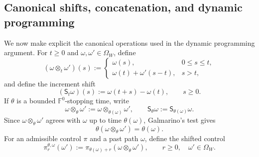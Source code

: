 \documentclass[11pt]{article}
\theoremstyle{definition}
\theoremstyle{remark}
\numberwithin{equation}{section}
\begin{document}
\subsection{Canonical shifts, concatenation, and dynamic programming}\label{subsec:DPP}
We now make explicit the canonical operations used in the dynamic programming argument.  For
$t\ge0$ and $\omega,\omega'\in\Omega_W$, define
\begin{equation}\label{eq:path-concatenation-control}
 (\omega\otimes_t\omega')(s)
 :=
 \begin{cases}
  \omega(s),&0\le s\le t,\\
  \omega(t)+\omega'(s-t),&s>t,
 \end{cases}
\end{equation}
and define the increment shift
\begin{equation}\label{eq:Wiener-shift-control}
 (\mathsf S_t\omega)(s):=\omega(t+s)-\omega(t),
 \qquad s\ge0.
\end{equation}
If $\theta$ is a bounded $\mathbb F^0$-stopping time, write
\[
 \omega\otimes_\theta\omega'
 :=\omega\otimes_{\theta(\omega)}\omega',
 \qquad
 \mathsf S_\theta\omega:=\mathsf S_{\theta(\omega)}\omega.
\]
Since $\omega\otimes_\theta\omega'$ agrees with $\omega$ up to time $\theta(\omega)$,
Galmarino's test gives
\begin{equation}\label{eq:stopping-time-stable-concatenation}
 \theta(\omega\otimes_\theta\omega')=\theta(\omega).
\end{equation}
For an admissible control $\pi$ and a past path $\omega$, define the shifted control
\begin{equation}\label{eq:shifted-control-definition}
 \pi_r^{\theta,\omega}(\omega')
 :=\pi_{\theta(\omega)+r}(\omega\otimes_\theta\omega'),
 \qquad r\ge0,
 \quad \omega'\in\Omega_W.
\end{equation}
\end{document}
